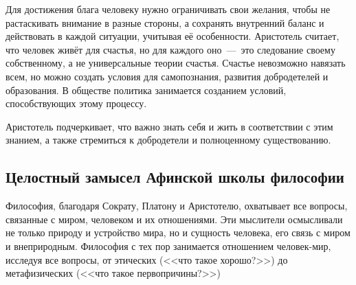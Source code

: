Для достижения блага человеку нужно ограничивать свои желания, чтобы не растаскивать внимание в разные стороны, а сохранять внутренний баланс и действовать в каждой ситуации, учитывая её особенности. Аристотель считает, что человек живёт для счастья, но для каждого оно~---~это следование своему собственному, а не универсальные теории счастья. Счастье невозможно навязать всем, но можно создать условия для самопознания, развития добродетелей и образования. В обществе политика занимается созданием условий, способствующих этому процессу.

Аристотель подчеркивает, что важно знать себя и жить в соответствии с этим знанием, а также стремиться к добродетели и полноценному существованию.

\subsection{Целостный замысел Афинской школы философии}



Философия, благодаря Сократу, Платону и Аристотелю, охватывает все вопросы, связанные с миром, человеком и их отношениями. Эти мыслители осмысливали не только природу и устройство мира, но и сущность человека, его связь с миром и внеприродным. Философия с тех пор занимается отношением человек-мир, исследуя все вопросы, от этических (<<что такое хорошо?>>) до метафизических (<<что такое первопричины?>>)

